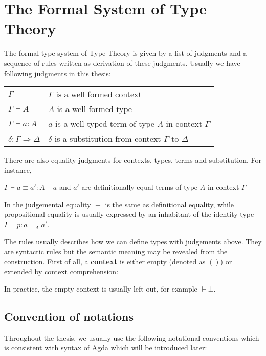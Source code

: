 \section{The Formal System of Type Theory}

The formal type system of Type Theory is given by a list of judgments and a sequence of rules written as derivation of these judgments. Usually we have following judgments in this thesis:


\begin{tabular}{l l}
$\Gamma \vdash$ & $\Gamma$  is a well formed context \\
$\Gamma \vdash A$ & $A$  is a well formed type \\
$\Gamma \vdash a : A$ & $a$ is a well typed term of type $A$ in context $\Gamma$ \\
$\delta : \Gamma \Rightarrow \Delta$ & $\delta$ is a substitution from context $\Gamma$ to $\Delta$ \\
\end{tabular}

There are also equality judgments for contexts, types, terms and substitution. For instance,

$\Gamma \vdash a \equiv a' : A$  ~ $a$ and $a'$ are definitionally equal terms of type $A$ in context $\Gamma$

In \itt the judgemental equality $\equiv$ is the same as definitional equality, while propositional equality is usually expressed by an inhabitant of the identity type $\Gamma \vdash p: a =_{A} a' $.



The rules usually describes how we can define types with judgements above. They are syntactic rules but the semantic meaning may be revealed from the construction.
First of all, a \textbf{context} is either empty (denoted as $()$) or extended by context comprehension:


In practice, the empty context is usually left out, for example $\vdash \bot$.



\subsection{Convention of notations}

Throughout the thesis, we usually use the following notational conventions which is consistent with syntax of Agda which will be introduced later:

